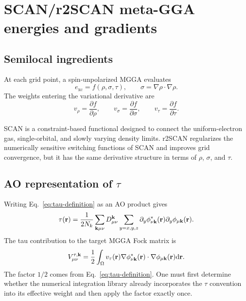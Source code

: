 \section{SCAN/r2SCAN meta-GGA energies and gradients}
\label{sec:mgga}

\subsection{Semilocal ingredients}

At each grid point, a spin-unpolarized MGGA evaluates
\begin{equation}
  e_{\mathrm{xc}}
  =f(\rho,\sigma,\tau),
  \qquad \sigma=\nabla\rho\cdot\nabla\rho.
  \label{eq:mgga-ingredients}
\end{equation}
The weights entering the variational derivative are
\begin{equation}
  v_\rho=\frac{\partial f}{\partial\rho},
  \qquad
  v_\sigma=\frac{\partial f}{\partial\sigma},
  \qquad
  v_\tau=\frac{\partial f}{\partial\tau}.
  \label{eq:mgga-weights}
\end{equation}

SCAN is a constraint-based functional designed to connect the uniform-electron
gas, single-orbital, and slowly varying density limits.  r2SCAN regularizes the
numerically sensitive switching functions of SCAN and improves grid
convergence, but it has the same derivative structure in terms of $\rho$,
$\sigma$, and $\tau$.

\subsection{AO representation of \texorpdfstring{$\tau$}{tau}}

Writing Eq.~\eqref{eq:tau-definition} as an AO product gives
\begin{equation}
  \tau(\mathbf r)
  =\frac{1}{2N_k}\sum_{\mathbf{k}\mu\nu}D_{\mu\nu}^{\mathbf{k}}
   \sum_{y=x,y,z}
   \partial_y\phi_{\nu\mathbf{k}}^{*}(\mathbf r)
   \partial_y\phi_{\mu\mathbf{k}}(\mathbf r).
  \label{eq:mgga-tau-ao}
\end{equation}
The tau contribution to the target MGGA Fock matrix is
\begin{equation}
  V_{\mu\nu}^{\tau,\mathbf{k}}
  =\frac12\int_\Omega v_\tau(\mathbf r)
   \nabla\phi_{\nu\mathbf{k}}^{*}(\mathbf r)\cdot
   \nabla\phi_{\mu\mathbf{k}}(\mathbf r)\mathrm{d}\mathbf r.
  \label{eq:mgga-vtau-matrix}
\end{equation}
The factor $1/2$ comes from Eq.~\eqref{eq:tau-definition}.  One must first
determine whether the numerical integration library already incorporates the
$\tau$ convention into its effective weight and then apply the factor exactly
once.

